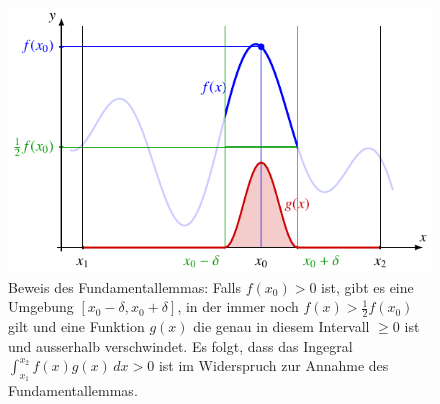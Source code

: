 %
%
%
\begin{figure}
\centering
\includegraphics{chapters/020-variation/images/fundamentallemma.pdf}
\caption{Beweis des Fundamentallemmas: Falls $f(x_0)>0$ ist, gibt es
eine Umgebung $[x_0-\delta,x_0+\delta]$, in der immer noch
$f(x)>\frac12f(x_0)$ gilt und eine Funktion $g(x)$ die genau in diesem
Intervall $\ge 0$ ist und ausserhalb verschwindet.
Es folgt, dass das Ingegral $\int_{x_1}^{x_2} f(x)g(x)\,dx>0$ ist
im Widerspruch zur Annahme des Fundamentallemmas.
\label{buch:variation:fundamentallemma:fig:beweis}}
\end{figure}
